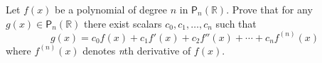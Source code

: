 Let $f(x)$ be a polynomial of degree $n$ in
$\mathsf{P}_n(\mathbb{R})$. Prove that for any $ g(x) \in
\mathsf{P}_n(\mathbb{R})$ there exist scalars $c_0,c_1,\dots,c_n$ such
that 
\[
g(x) = c_0f(x) + c_1f'(x) + c_2f''(x) + \cdots + c_nf^{(n)}(x)
\]
where $f^{(n)}(x)$ denotes {\it n}th derivative of $f(x)$.
